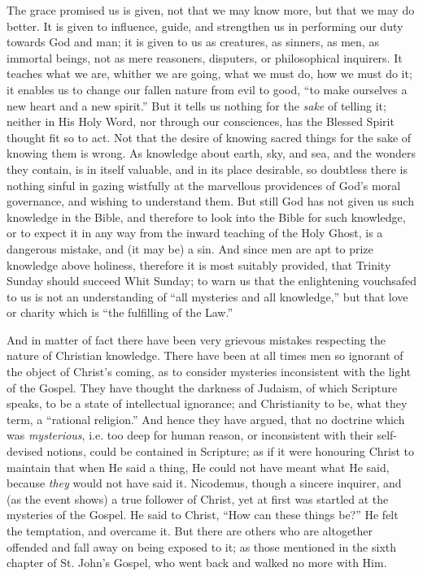 The grace promised us is given, not that we may know
more, but that we may do better. It is given to
influence, guide, and strengthen us in performing our
duty towards God and man; it is given to us as creatures,
as sinners, as men, as immortal beings, not as mere
reasoners, disputers, or philosophical inquirers. It
teaches what we are, whither we are going, what we must
do, how we must do it; it enables us to change our fallen
nature from evil to good, ``to make ourselves a new
heart and a new spirit.'' But it tells us nothing for
the \emph{sake} of telling it; neither in His Holy
Word, nor through our consciences, has the Blessed Spirit
thought fit so to act. Not that the desire of knowing
sacred things for the sake of knowing them is wrong. As
knowledge about earth, sky, and sea, and the wonders they
contain, is in itself valuable, and in its place
desirable, so doubtless there is nothing sinful in gazing
wistfully at the marvellous providences of God's moral
governance, and wishing to understand them. But still God
has not given us such knowledge in the Bible, and
therefore to look into the Bible for such knowledge, or
to expect it in any way from the inward teaching of the
Holy Ghost, is a dangerous mistake, and (it may be) a
sin. And since men are apt to prize knowledge above
holiness, therefore it is most suitably provided, that
Trinity Sunday should succeed Whit Sunday; to warn us
that the enlightening vouchsafed to us is not an
understanding of ``all mysteries and all
knowledge,'' but that love or charity which is
``the fulfilling of the Law.''

And in matter of fact there have been very grievous
mistakes respecting the nature of Christian knowledge.
There have been at all times men so ignorant of the
object of Christ's coming, as to consider mysteries
inconsistent with the light of the Gospel. They have
thought the darkness of Judaism, of which Scripture
speaks, to be a state of intellectual ignorance; and Christianity to be, what they term, a ``rational
religion.'' And hence they have argued, that no
doctrine which was \emph{mysterious}, i.e. too deep
for human reason, or inconsistent with their self-devised
notions, could be contained in Scripture; as if it were
honouring Christ to maintain that when He said a thing,
He could not have meant what He said, because \emph{they}
would not have said it. Nicodemus, though a sincere
inquirer, and (as the event shows) a true follower of
Christ, yet at first was startled at the mysteries of the
Gospel. He said to Christ, ``How can these things
be?'' He felt the temptation, and overcame it. But
there are others who are altogether offended and fall
away on being exposed to it; as those mentioned in the
sixth chapter of St. John's Gospel, who went back and
walked no more with Him.

